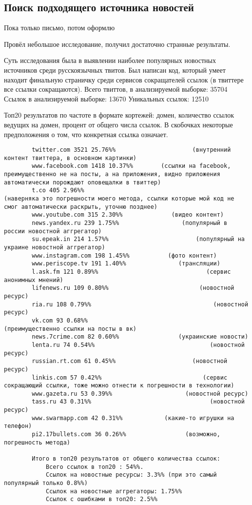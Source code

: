     \subsection{Поиск подходящего источника новостей}
        Пока только письмо, потом оформлю

        Провёл небольшое исследование, получил достаточно странные результаты.

        Суть исследования была в выявлении наиболее популярных новостных источников среди русскоязычных твитов.
        Был написан код, который умеет находит финальную страничку среди сервисов сокращателей ссылок (в твиттере все ссылки сокращаются).
        Всего твиттов, в анализируемой выборке: 35704
        Ссылок в анализируемой выборке: 13670
        Уникальных ссылок: 12510

        Топ20 результатов по частоте в формате кортежей: домен, количество ссылок ведущих на домен, процент от общего числа ссылок. В скобочках некоторые предположения о том, что конкретная ссылка означает.
        \begin{verbatim}
        twitter.com 3521 25.76%%                      (внутренний контент твиттера, в основном картинки)
        www.facebook.com 1418 10.37%%        (ссылки на facebook, преимущественно не на посты, а на приложения, видно приложения автоматически порождают оповещалки в твиттер)
        t.co 405 2.96%%                                      (наверняка это погрешности моего метода, ссылки которые мой код не смог автоматически раскрыть, уточню позднее)
        www.youtube.com 315 2.30%%              (видео контент)
        news.yandex.ru 239 1.75%%                  (популярный в россии новостной аггрегатор)
        su.epeak.in 214 1.57%%                         (популярный на украине новостной аггрегатор)
        www.instagram.com 198 1.45%%           (фото контент)
        www.periscope.tv 191 1.40%%               (трансляции)
        l.ask.fm 121 0.89%%                               (сервис анонимных мнений)
        lifenews.ru 109 0.80%%                          (новостной ресурс)
        ria.ru 108 0.79%%                                   (новостной ресурс)
        vk.com 93 0.68%%                                  (преимущественно ссылки на посты в вк)
        news.7crime.com 82 0.60%%                 (украинские новости)
        lenta.ru 74 0.54%%                                 (новостной ресурс)
        russian.rt.com 61 0.45%%                      (новостной ресурс)
        linkis.com 57 0.42%%                             (сервис сокращающий ссылки, тоже можно отнести к погрешности в технологии)
        www.gazeta.ru 53 0.39%%                     (новостной ресурс)
        tass.ru 43 0.31%%                                  (новостной ресурс)
        www.swarmapp.com 42 0.31%%            (какие-то игрушки на телефон)
        pi2.17bullets.com 36 0.26%%                 (возможно, погрешность метода)

        Итого в топ20 результатов от общего количества ссылок:
            Всего ссылок в топ20 : 54%%.
            Ссылок на новостные ресурсы: 3.3%% (при это самый популярный только 0.8%%)
            Ссылок на новостные аггрегаторы: 1.75%%
            Ссылок с ошибками в топ20: 2.5%%
        \end{verbatim}
